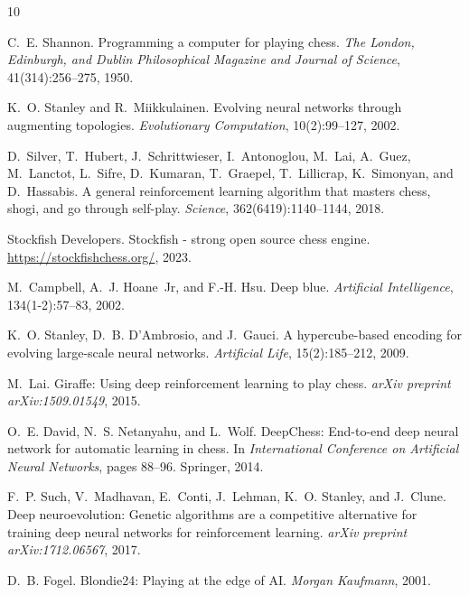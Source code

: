 \documentclass[11pt, twocolumn]{article}
\begin{document}
\begin{thebibliography}{10}

C.~E. Shannon.
\newblock Programming a computer for playing chess.
\newblock \emph{The London, Edinburgh, and Dublin Philosophical Magazine and Journal of Science}, 41(314):256--275, 1950.

K.~O. Stanley and R.~Miikkulainen.
\newblock Evolving neural networks through augmenting topologies.
\newblock \emph{Evolutionary Computation}, 10(2):99--127, 2002.

D.~Silver, T.~Hubert, J.~Schrittwieser, I.~Antonoglou, M.~Lai, A.~Guez, M.~Lanctot, L.~Sifre, D.~Kumaran, T.~Graepel, T.~Lillicrap, K.~Simonyan, and D.~Hassabis.
\newblock A general reinforcement learning algorithm that masters chess, shogi, and go through self-play.
\newblock \emph{Science}, 362(6419):1140--1144, 2018.

{Stockfish Developers}.
\newblock Stockfish - strong open source chess engine.
\newblock \url{https://stockfishchess.org/}, 2023.

M.~Campbell, A.~J. Hoane~Jr, and F.-H. Hsu.
\newblock Deep blue.
\newblock \emph{Artificial Intelligence}, 134(1-2):57--83, 2002.

K.~O. Stanley, D.~B. D'Ambrosio, and J.~Gauci.
\newblock A hypercube-based encoding for evolving large-scale neural networks.
\newblock \emph{Artificial Life}, 15(2):185--212, 2009.

M.~Lai.
\newblock Giraffe: Using deep reinforcement learning to play chess.
\newblock \emph{arXiv preprint arXiv:1509.01549}, 2015.

O.~E. David, N.~S. Netanyahu, and L.~Wolf.
\newblock DeepChess: End-to-end deep neural network for automatic learning in chess.
\newblock In \emph{International Conference on Artificial Neural Networks}, pages 88--96. Springer, 2014.

F.~P. Such, V.~Madhavan, E.~Conti, J.~Lehman, K.~O. Stanley, and J.~Clune.
\newblock Deep neuroevolution: Genetic algorithms are a competitive alternative for training deep neural networks for reinforcement learning.
\newblock \emph{arXiv preprint arXiv:1712.06567}, 2017.

D.~B. Fogel.
\newblock Blondie24: Playing at the edge of {AI}.
\newblock \emph{Morgan Kaufmann}, 2001.

\end{thebibliography}
\end{document}
